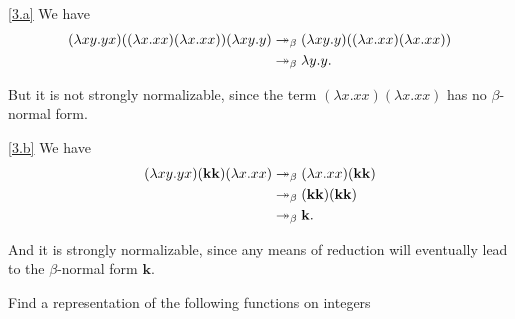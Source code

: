 \documentclass{homework}
\begin{document}
\begin{solution}

  \ref{3.a} We have
  \begin{align*}
    (\lambda xy.yx)((\lambda x.xx)(\lambda x.xx))(\lambda xy.y) &\twoheadrightarrow_{\beta} (\lambda xy.y)((\lambda x.xx)(\lambda x.xx)) \\
    &\twoheadrightarrow_{\beta} \lambda y.y.
  \end{align*}

  But it is not strongly normalizable, since the term $(\lambda x.xx)(\lambda x.xx)$ has no \(\beta\)-normal form.

  \ref{3.b} We have
  \begin{align*}
    (\lambda xy.yx)(\mathbf{k} \mathbf{k})(\lambda x.xx) &\twoheadrightarrow_{\beta} (\lambda x.xx)(\mathbf{k}\mathbf{k}) \\
    &\twoheadrightarrow_{\beta} (\mathbf{k}\mathbf{k})(\mathbf{k}\mathbf{k}) \\
    &\twoheadrightarrow_{\beta} \mathbf{k}.
  \end{align*}

  And it is strongly normalizable,
  since any means of reduction will eventually lead to the \(\beta\)-normal form $\mathbf{k}$.

\end{solution}

\begin{problem}
  Find a representation of the following functions on integers
\end{problem}
\end{document}
